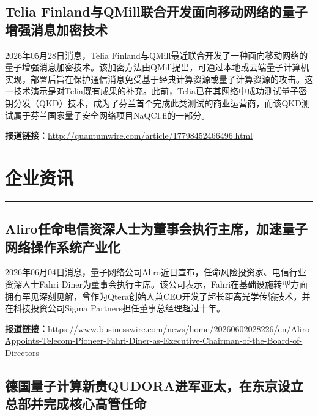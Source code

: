 \documentclass[12pt,a4paper]{ctexart}
\begin{document}
\subsection{ Telia Finland与QMill联合开发面向移动网络的量子增强消息加密技术 }

2026年05月28日消息，Telia Finland与QMill最近联合开发了一种面向移动网络的量子增强消息加密技术。该加密方法由QMill提出，可通过本地或云端量子计算机实现，部署后旨在保护通信消息免受基于经典计算资源或量子计算资源的攻击。这一技术演示是对Telia既有成果的补充。此前，Telia已在其网络中成功测试量子密钥分发（QKD）技术，成为了芬兰首个完成此类测试的商业运营商，而该QKD测试属于芬兰国家量子安全网络项目NaQCI.fi的一部分。

\noindent\textbf{报道链接：}\url{http://quantumwire.com/article/17798452466496.html}




\newpage
\section{企业资讯}
\vspace{-0.5em}
\noindent\rule{\linewidth}{1.5pt}

\subsection{ Aliro任命电信资深人士为董事会执行主席，加速量子网络操作系统产业化 }

2026年06月04日消息，量子网络公司Aliro近日宣布，任命风险投资家、电信行业资深人士Fahri Diner为董事会执行主席。该公司表示，Fahri在基础设施转型方面拥有罕见深刻见解，曾作为Qtera创始人兼CEO开发了超长距离光学传输技术，并在科技投资公司Sigma Partners担任董事总经理超过十年。

\noindent\textbf{报道链接：}\url{https://www.businesswire.com/news/home/20260602028226/en/Aliro-Appoints-Telecom-Pioneer-Fahri-Diner-as-Executive-Chairman-of-the-Board-of-Directors}

\subsection{ 德国量子计算新贵QUDORA进军亚太，在东京设立总部并完成核心高管任命 }
\end{document}
